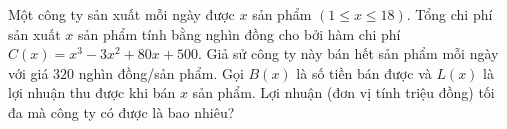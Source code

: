 \begin{ex}
Một công ty sản xuất mỗi ngày được $x$ sản phẩm $(1\le x\le18)$. Tổng chi phí sản xuất $x$ sản phẩm tính bằng nghìn đồng cho bởi hàm chi phí $C(x)=x^3-3x^2+80x+500$. Giả sử công ty này bán hết sản phẩm mỗi ngày với giá $320$ nghìn đồng/sản phẩm. Gọi $B(x)$ là số tiền bán được và $L(x)$ là lợi nhuận thu được khi bán $x$ sản phẩm. Lợi nhuận (đơn vị tính triệu đồng) tối đa mà công ty có được là bao nhiêu?
\end{ex}
